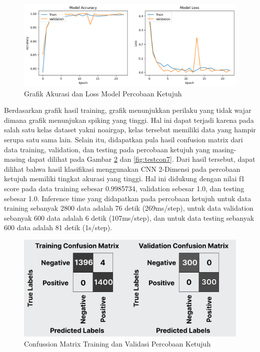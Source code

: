 \begin{figure} [H] \centering
    \includegraphics[scale=0.5]{gambar/bab4/trainres7.png}
    \caption{Grafik Akurasi dan Loss Model Percobaan Ketujuh}
    \label{fig:trainres7}
\end{figure}

Berdasarkan grafik hasil training, grafik menunjukkan perilaku yang tidak wajar dimana grafik menunjukan spiking yang tinggi. Hal ini dapat terjadi karena pada salah satu kelas dataset yakni noairgap, kelas tersebut memiliki data yang hampir serupa satu sama lain. Selain itu, didapatkan pula hasil confusion matrix dari data training, validation, dan testing pada percobaan ketujuh yang masing-masing dapat dilihat pada Gambar \ref{fig:tvcon7} dan \ref{fig:testcon7}. Dari hasil tersebut, dapat dilihat bahwa hasil klasifikasi menggunakan CNN 2-Dimensi pada percobaan ketujuh memiliki tingkat akurasi yang tinggi. Hal ini didukung dengan nilai f1 score pada data training sebesar 0.9985734, validation sebesar 1.0, dan testing sebesar 1.0. Inference time yang didapatkan pada percobaan ketujuh untuk data training sebanyak 2800 data adalah 76 detik (269ms/step), untuk data validation sebanyak 600 data adalah 6 detik (107ms/step), dan untuk data testing sebanyak 600 data adalah 81 detik (1s/step).

\begin{figure} [H] \centering
    \includegraphics[scale=0.3]{gambar/bab4/tvcon7.png}
    \caption{Confussion Matrix Training dan Validasi Percobaan Ketujuh}
    \label{fig:tvcon7}
\end{figure}

